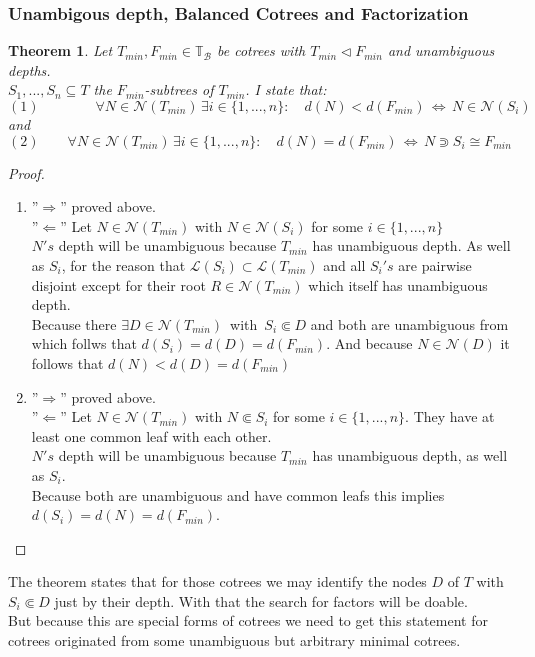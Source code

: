 \documentclass[a4paper,12pt]{article}
\newtheorem{theorem}{Theorem}[section]
\theoremstyle{definition}
\begin{document}
		\subsubsection{Unambigous depth, Balanced Cotrees and Factorization}
		\begin{theorem}
			Let $T_{min},F_{min}\in\mathds{T}_{\mathcal{B}}$ be cotrees with $T_{min}\vartriangleleft F_{min}$ and unambiguous depths.\\ $S_1,...,S_n\subseteq T$ the $F_{min}$-subtrees of $T_{min}$. I state that:
			\[(1)\qquad \qquad \forall N\in \mathcal{N}(T_{min})\, \exists i\in\{1,...,n\}:\quad d(N)<d(F_{min})\,\Longleftrightarrow\, N\in \mathcal{N}(S_i) \]
			and
			\[(2)\qquad \forall N\in \mathcal{N}(T_{min})\, \exists i\in\{1,...,n\}:\quad d(N)= d(F_{min})\,\Longleftrightarrow\, N \Supset S_i\cong F_{min} \]
		\end{theorem}
	\begin{proof}
		\begin{enumerate}[(1)]
			\item ''$\Rightarrow$'' proved above.\\
			''$\Leftarrow$'' Let $N\in\mathcal{N}(T_{min})$ with $N\in \mathcal{N}(S_i)$ for some $i\in\{1,...,n\}$\\
			$N's$ depth will be unambiguous because $T_{min}$ has unambiguous depth. As well as $S_i$, for the reason that $\mathcal{L}(S_i)\subset \mathcal{L}(T_{min})$ and all $S_i's$ are pairwise disjoint except for their root $R\in \mathcal{N}(T_{min})$ which itself has unambiguous depth.\\
			Because there $\exists D\in \mathcal{N}(T_{min})\,  $ with $\,S_i\Subset D$ and both are unambiguous from which follws that $d(S_i)=d(D)=d(F_{min})$. And because $N\in \mathcal{N}(D)$ it follows that $d(N)< d(D)=d(F_{min})$ 
			\item ''$\Rightarrow$'' proved above.\\
			''$\Leftarrow$'' Let $N\in\mathcal{N}(T_{min})$ with $N \Subset S_i$ for some $i\in\{1,...,n\}$. They have at least one common leaf with each other.\\
			$N's$ depth will be unambiguous because $T_{min}$ has unambiguous depth, as well as $S_i$.\\
			Because both are unambiguous and have common leafs this implies $d(S_i)=d(N)=d(F_{min})$.
		\end{enumerate}
	\end{proof}
		The theorem states that for those cotrees we may identify the nodes $D$ of $T$ with $S_i \Subset D$ just by their depth. With that the search for factors will be doable.\\
		But because this are special forms of cotrees we need to get this statement for cotrees originated from some unambiguous but arbitrary minimal cotrees. 
	
\end{document}
